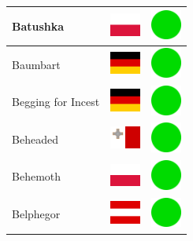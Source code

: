 \documentclass[12pt, a4paper, twoside]{report}
\begin{document}
\begin{center}
\begin{longtable}{|p{5cm}|p{2cm}|p{2cm}|}
 Batushka                                                   & \includegraphics[width=1cm]{../4x3/pl} &   \includegraphics[width=1cm]{../likes/y} \\ \hline
 Baumbart                                                   & \includegraphics[width=1cm]{../4x3/de} &   \includegraphics[width=1cm]{../likes/y} \\ \hline
 Begging for Incest                                         & \includegraphics[width=1cm]{../4x3/de} &   \includegraphics[width=1cm]{../likes/y} \\ \hline
 Beheaded                                                   & \includegraphics[width=1cm]{../4x3/mt} &   \includegraphics[width=1cm]{../likes/y} \\ \hline
 Behemoth                                                   & \includegraphics[width=1cm]{../4x3/pl} &   \includegraphics[width=1cm]{../likes/y} \\ \hline
 Belphegor                                                  & \includegraphics[width=1cm]{../4x3/at} &   \includegraphics[width=1cm]{../likes/y} \\ \hline

\end{longtable}
\end{center}
\end{document}
